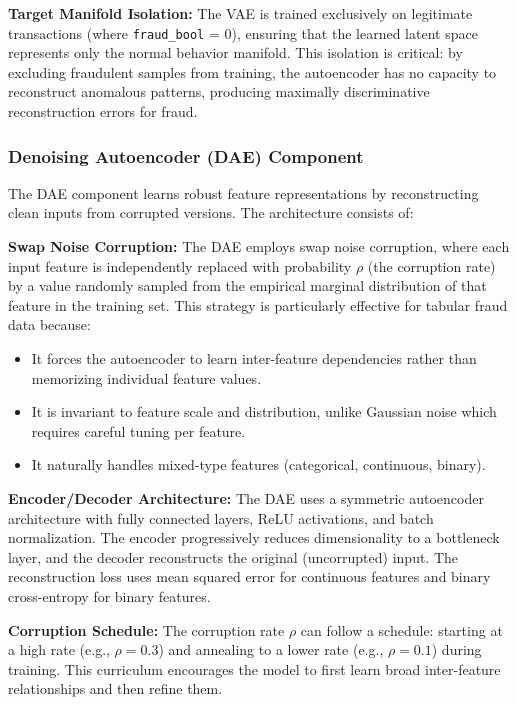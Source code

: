 \textbf{Target Manifold Isolation:} The VAE is trained exclusively on legitimate transactions (where \texttt{fraud\_bool} = 0), ensuring that the learned latent space represents only the normal behavior manifold. This isolation is critical: by excluding fraudulent samples from training, the autoencoder has no capacity to reconstruct anomalous patterns, producing maximally discriminative reconstruction errors for fraud.

\subsubsection{Denoising Autoencoder (DAE) Component}

The DAE component learns robust feature representations by reconstructing clean inputs from corrupted versions. The architecture consists of:

\textbf{Swap Noise Corruption:} The DAE employs swap noise corruption, where each input feature is independently replaced with probability $\rho$ (the corruption rate) by a value randomly sampled from the empirical marginal distribution of that feature in the training set. This strategy is particularly effective for tabular fraud data because:
\begin{itemize}
\item It forces the autoencoder to learn inter-feature dependencies rather than memorizing individual feature values.
\item It is invariant to feature scale and distribution, unlike Gaussian noise which requires careful tuning per feature.
\item It naturally handles mixed-type features (categorical, continuous, binary).
\end{itemize}

\textbf{Encoder/Decoder Architecture:} The DAE uses a symmetric autoencoder architecture with fully connected layers, ReLU activations, and batch normalization. The encoder progressively reduces dimensionality to a bottleneck layer, and the decoder reconstructs the original (uncorrupted) input. The reconstruction loss uses mean squared error for continuous features and binary cross-entropy for binary features.

\textbf{Corruption Schedule:} The corruption rate $\rho$ can follow a schedule: starting at a high rate (e.g., $\rho = 0.3$) and annealing to a lower rate (e.g., $\rho = 0.1$) during training. This curriculum encourages the model to first learn broad inter-feature relationships and then refine them.

